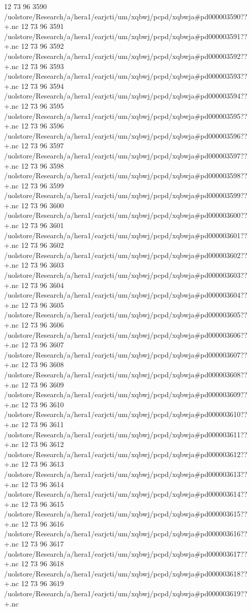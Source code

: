 12 73 96
3590
/uolstore/Research/a/hera1/earjcti/um/xqbwj/pcpd/xqbwja#pd000003590??+.nc
12 73 96
3591
/uolstore/Research/a/hera1/earjcti/um/xqbwj/pcpd/xqbwja#pd000003591??+.nc
12 73 96
3592
/uolstore/Research/a/hera1/earjcti/um/xqbwj/pcpd/xqbwja#pd000003592??+.nc
12 73 96
3593
/uolstore/Research/a/hera1/earjcti/um/xqbwj/pcpd/xqbwja#pd000003593??+.nc
12 73 96
3594
/uolstore/Research/a/hera1/earjcti/um/xqbwj/pcpd/xqbwja#pd000003594??+.nc
12 73 96
3595
/uolstore/Research/a/hera1/earjcti/um/xqbwj/pcpd/xqbwja#pd000003595??+.nc
12 73 96
3596
/uolstore/Research/a/hera1/earjcti/um/xqbwj/pcpd/xqbwja#pd000003596??+.nc
12 73 96
3597
/uolstore/Research/a/hera1/earjcti/um/xqbwj/pcpd/xqbwja#pd000003597??+.nc
12 73 96
3598
/uolstore/Research/a/hera1/earjcti/um/xqbwj/pcpd/xqbwja#pd000003598??+.nc
12 73 96
3599
/uolstore/Research/a/hera1/earjcti/um/xqbwj/pcpd/xqbwja#pd000003599??+.nc
12 73 96
3600
/uolstore/Research/a/hera1/earjcti/um/xqbwj/pcpd/xqbwja#pd000003600??+.nc
12 73 96
3601
/uolstore/Research/a/hera1/earjcti/um/xqbwj/pcpd/xqbwja#pd000003601??+.nc
12 73 96
3602
/uolstore/Research/a/hera1/earjcti/um/xqbwj/pcpd/xqbwja#pd000003602??+.nc
12 73 96
3603
/uolstore/Research/a/hera1/earjcti/um/xqbwj/pcpd/xqbwja#pd000003603??+.nc
12 73 96
3604
/uolstore/Research/a/hera1/earjcti/um/xqbwj/pcpd/xqbwja#pd000003604??+.nc
12 73 96
3605
/uolstore/Research/a/hera1/earjcti/um/xqbwj/pcpd/xqbwja#pd000003605??+.nc
12 73 96
3606
/uolstore/Research/a/hera1/earjcti/um/xqbwj/pcpd/xqbwja#pd000003606??+.nc
12 73 96
3607
/uolstore/Research/a/hera1/earjcti/um/xqbwj/pcpd/xqbwja#pd000003607??+.nc
12 73 96
3608
/uolstore/Research/a/hera1/earjcti/um/xqbwj/pcpd/xqbwja#pd000003608??+.nc
12 73 96
3609
/uolstore/Research/a/hera1/earjcti/um/xqbwj/pcpd/xqbwja#pd000003609??+.nc
12 73 96
3610
/uolstore/Research/a/hera1/earjcti/um/xqbwj/pcpd/xqbwja#pd000003610??+.nc
12 73 96
3611
/uolstore/Research/a/hera1/earjcti/um/xqbwj/pcpd/xqbwja#pd000003611??+.nc
12 73 96
3612
/uolstore/Research/a/hera1/earjcti/um/xqbwj/pcpd/xqbwja#pd000003612??+.nc
12 73 96
3613
/uolstore/Research/a/hera1/earjcti/um/xqbwj/pcpd/xqbwja#pd000003613??+.nc
12 73 96
3614
/uolstore/Research/a/hera1/earjcti/um/xqbwj/pcpd/xqbwja#pd000003614??+.nc
12 73 96
3615
/uolstore/Research/a/hera1/earjcti/um/xqbwj/pcpd/xqbwja#pd000003615??+.nc
12 73 96
3616
/uolstore/Research/a/hera1/earjcti/um/xqbwj/pcpd/xqbwja#pd000003616??+.nc
12 73 96
3617
/uolstore/Research/a/hera1/earjcti/um/xqbwj/pcpd/xqbwja#pd000003617??+.nc
12 73 96
3618
/uolstore/Research/a/hera1/earjcti/um/xqbwj/pcpd/xqbwja#pd000003618??+.nc
12 73 96
3619
/uolstore/Research/a/hera1/earjcti/um/xqbwj/pcpd/xqbwja#pd000003619??+.nc
